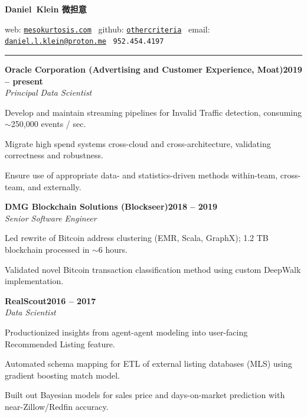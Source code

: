 \documentclass{article}
\newcommand{\ressection}[1]{\noindent{\large\textbf{#1}}\vspace{2pt}\hrule\vspace{4pt}}
\newcommand{\leftandright}[2]{\noindent\textbf{#1}\hfill\textbf{#2}}
\begin{document}
\sffamily

\noindent
\begin{center}
    
\textbf{\huge{Daniel~Klein 微担意}}

web: \href{http://mesokurtosis.com}{\texttt{mesokurtosis.com}}
\textbullet\,
github: \href{https://github.com/othercriteria}{\texttt{othercriteria}}
\textbullet\,
email: \href{mailto:daniel.l.klein@proton.me}{\texttt{daniel.l.klein@proton.me}}
\textbullet\,
\texttt{952.454.4197}

\end{center}

\ressection{Experience}

\leftandright{Oracle Corporation (Advertising and Customer Experience, Moat)}{2019 -- present} \\
\textit{Principal Data Scientist}

\begin{itemize*}
\item Develop and maintain streaming pipelines for Invalid Traffic
  detection, consuming $\sim$250,000 events / sec.
\item Migrate high spend systems cross-cloud and cross-architecture,
  validating correctness and robustness.
\item Ensure use of appropriate data- and statistics-driven methods
  within-team, cross-team, and externally.
\end{itemize*}

\leftandright{DMG Blockchain Solutions (Blockseer)}{2018 -- 2019} \\
\textit{Senior Software Engineer}

\begin{itemize*}
\item Led rewrite of Bitcoin address clustering (EMR, Scala, GraphX);
  1.2 TB blockchain processed in $\sim$6 hours.
\item Validated novel Bitcoin transaction classification method using
  custom DeepWalk implementation.
\end{itemize*}

\leftandright{RealScout}{2016 -- 2017} \\
\textit{Data Scientist}

\begin{itemize*}
\item Productionized insights from agent-agent modeling into
  user-facing Recommended Listing feature.
\item Automated schema mapping for ETL of external listing databases
  (MLS) using gradient boosting match model.
\item Built out Bayesian models for sales price and days-on-market
  prediction with near-Zillow/Redfin accuracy.
\end{itemize*}
\end{document}
